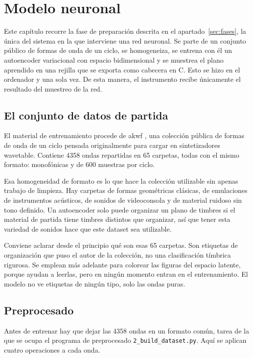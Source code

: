 \chapter{Modelo neuronal}
\label{cap:ml}

Este capítulo recorre la fase de preparación descrita en el
apartado~\ref{sec:fases}, la única del sistema en la que interviene una red
neuronal. Se parte de un conjunto público de formas de onda de un ciclo, se
homogeneiza, se entrena con él un autoencoder variacional con espacio
bidimensional y se muestrea el plano aprendido en una rejilla que se
exporta como cabecera en C. Esto se hizo en el ordenador y una sola vez. De esta manera,
el instrumento recibe únicamente el resultado del muestreo de la red.

\section{El conjunto de datos de partida}
\label{sec:datos}

El material de entrenamiento procede de \gls{akwf} \cite{AKWF}, una colección
pública de formas de onda de un ciclo pensada originalmente para cargar en
sintetizadores wavetable. Contiene 4358 ondas repartidas en 65 carpetas, todas
con el mismo formato: monofónicas y de 600 muestras por ciclo.

Esa homogeneidad de formato es lo que hace la colección utilizable sin apenas
trabajo de limpieza. Hay carpetas de formas geométricas clásicas, de emulaciones de instrumentos
acústicos, de sonidos de videoconsola y de material ruidoso sin tono definido.
Un autoencoder solo puede organizar un plano de timbres si el material de
partida tiene timbres distintos que organizar, así que tener esta variedad de sonidos
hace que este dataset sea utilizable.

Conviene aclarar desde el principio qué son esas 65 carpetas. Son etiquetas de
organización que puso el autor de la colección, no una clasificación tímbrica
rigurosa. Se emplean más adelante para colorear las figuras del espacio
latente, porque ayudan a leerlas, pero en ningún momento entran en el
entrenamiento. El modelo no ve etiquetas de ningún tipo, solo las ondas puras.

\section{Preprocesado}
\label{sec:preprocesado}

Antes de entrenar hay que dejar las 4358 ondas en un formato común, tarea de
la que se ocupa el programa de preprocesado
\texttt{2\_\allowbreak build\_\allowbreak dataset.py}. Aquí se aplican cuatro operaciones a
cada onda.

